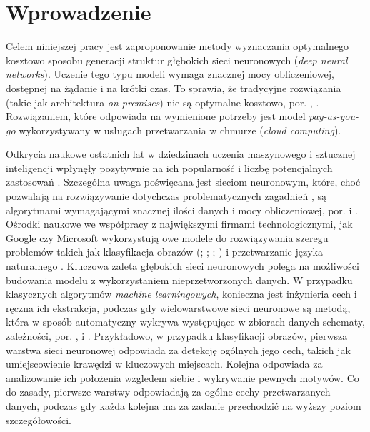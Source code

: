 \documentclass[12pt,a4paper,twoside]{article}
\begin{document}
\clearpage
\thispagestyle{empty}
\mbox{}

\clearpage

\tableofcontents

\clearpage

\section{Wprowadzenie}
\noindent
Celem niniejszej pracy jest zaproponowanie metody wyznaczania optymalnego kosztowo sposobu generacji struktur głębokich sieci neuronowych (\textit{deep neural networks}). Uczenie tego typu modeli wymaga znacznej mocy obliczeniowej, dostępnej na żądanie i na krótki czas. To sprawia, że tradycyjne rozwiązania (takie jak architektura \textit{on premises}) nie są optymalne kosztowo, por. \citet{armburst2010}, \citet{oecd2014}. Rozwiązaniem, które odpowiada na wymienione potrzeby jest model \textit{pay-as-you-go} wykorzystywany w usługach przetwarzania w chmurze (\textit{cloud computing}).

Odkrycia naukowe ostatnich lat w dziedzinach uczenia maszynowego i sztucznej inteligencji wpłynęły pozytywnie na ich popularność i liczbę potencjalnych zastosowań \citep{lecun2015}. Szczególna uwaga poświęcana jest sieciom neuronowym, które, choć pozwalają na rozwiązywanie dotychczas problematycznych zagadnień \citep{lecun2015}, są algorytmami wymagającymi znacznej ilości danych i mocy obliczeniowej, por. \citet{krizhevsky2012} i \citet{srivastava2014}. Ośrodki naukowe we współpracy z największymi firmami technologicznymi, jak Google czy Microsoft wykorzystują owe modele \citep{goodfellow2016} do rozwiązywania szeregu problemów takich jak klasyfikacja obrazów (\citet{krizhevsky2012}; \citet{shetty2016}; \citet{szegedy2014}; \citet{chen2016}) i przetwarzanie języka naturalnego \citep{hinton2012}. Kluczowa zaleta głębokich sieci neuronowych polega na możliwości budowania modelu z wykorzystaniem nieprzetworzonych danych. W przypadku klasycznych algorytmów \textit{machine learningowych}, konieczna jest inżynieria cech i ręczna ich ekstrakcja, podczas gdy wielowarstwowe sieci neuronowe są metodą, która w sposób automatyczny wykrywa występujące w zbiorach danych schematy, zależności, por. \citet{girschick2014}, \citet{gysel2016} i \citet{mnih2013}. Przykładowo, w przypadku klasyfikacji obrazów, pierwsza warstwa sieci neuronowej odpowiada za detekcję ogólnych jego cech, takich jak umiejscowienie krawędzi w kluczowych miejscach. Kolejna odpowiada za analizowanie ich położenia wzgledem siebie i wykrywanie pewnych motywów. Co do zasady, pierwsze warstwy odpowiadają za ogólne cechy przetwarzanych danych, podczas gdy każda kolejna ma za zadanie przechodzić na wyższy poziom szczegółowości.
\end{document}
